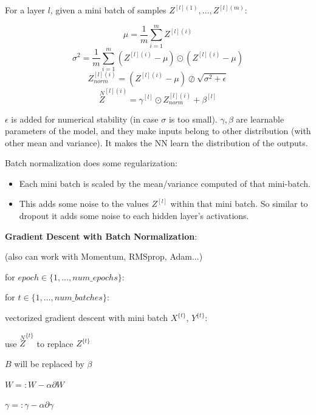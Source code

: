 \documentclass{article}
\begin{document}
\bigskip

\noindent For a layer \(l\), given a mini batch of samples \(Z^{[l](1)}, \dots, Z^{[l](m)}\):

\[\mu = \frac{1}{m} \sum^{m}_{i = 1} Z^{[l](i)}\]
\[\sigma^{2} = \frac{1}{m} \sum^{m}_{i = 1} (Z^{[l](i)} - \mu) \odot (Z^{[l](i)} - \mu)\]
\[Z^{[l](i)}_{norm} = (Z^{[l](i)} - \mu) \oslash \sqrt{\sigma^{2} + \epsilon}\]
\[\overset{N}{Z}^{[l](i)} = \gamma^{[l]} \odot Z^{[l](i)}_{norm} + \beta^{[l]}\]

\noindent \(\epsilon\) is added for numerical stability (in case \(\sigma\) is too small). \(\gamma, \beta\) are learnable parameters of the model, and they make inputs belong to other distribution (with other mean and variance). It makes the NN learn the distribution of the outputs.

\bigskip

\noindent Batch normalization does some regularization:

\begin{itemize}
    \item Each mini batch is scaled by the mean/variance computed of that mini-batch.
    \item This adds some noise to the values \(Z^{[l]}\) within that mini batch. So similar to dropout it adds some noise to each hidden layer's activations.
\end{itemize}

\noindent \textbf{Gradient Descent with Batch Normalization}:

\noindent (also can work with Momentum, RMSprop, Adam...)

\noindent for \(epoch \in \{1, \dots, num\_epochs\}\):

\noindent \hspace{.5cm} for \(t \in \{1, \dots, num\_batches\}\):

\noindent \hspace{1cm} vectorized gradient descent with mini batch \(X^{\{t\}}\), \(Y^{\{t\}}\):

\noindent \hspace{1cm} use \(\overset{N}{Z}^{\{t\}}\) to replace \(Z^{\{t\}}\)

\noindent \hspace{1cm} \(B\) will be replaced by \(\beta\)

\noindent \hspace{1cm} \(W =: W - \alpha \partial W\)

\noindent \hspace{1cm} \(\gamma =: \gamma - \alpha \partial \gamma\)
\end{document}

